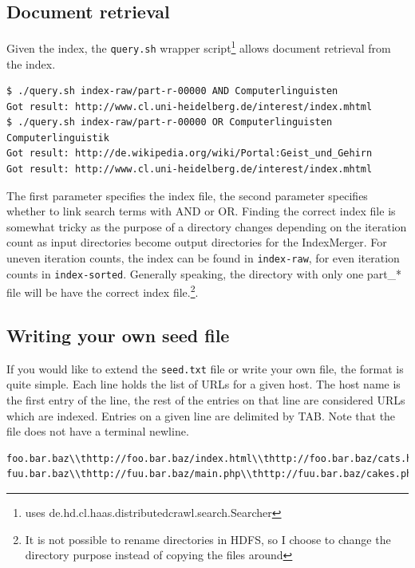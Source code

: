 \documentclass[10pt,a4paper]{report}
\begin{document}
\subsection*{Document retrieval}
Given the index, the \texttt{query.sh} wrapper script\footnote{uses de.hd.cl.haas.distributedcrawl.search.Searcher} allows document retrieval from the index.
\begin{verbatim}
$ ./query.sh index-raw/part-r-00000 AND Computerlinguisten
Got result: http://www.cl.uni-heidelberg.de/interest/index.mhtml
$ ./query.sh index-raw/part-r-00000 OR Computerlinguisten Computerlinguistik
Got result: http://de.wikipedia.org/wiki/Portal:Geist_und_Gehirn
Got result: http://www.cl.uni-heidelberg.de/interest/index.mhtml
\end{verbatim}
The first parameter specifies the index file, the second parameter specifies whether to link search terms with AND or OR. Finding the correct index file is somewhat tricky as
the purpose of a directory changes depending on the iteration count as input directories become output directories for the IndexMerger. For uneven iteration counts, the index can be found in \texttt{index-raw}, for even iteration counts in \texttt{index-sorted}. Generally speaking, the directory with only one part\_* file will be have the correct index file.\footnote{It is not possible to rename directories in HDFS, so I choose to change the directory purpose instead of copying the files around}.
\subsection*{Writing your own seed file}
If you would like to extend the \texttt{seed.txt} file or write your own file, the format is quite simple.
Each line holds the list of URLs for a given host. The host name is the first entry of the line, the rest of the entries
on that line are considered URLs which are indexed. Entries on a given line are delimited by TAB. Note that the file does not have a terminal newline.
\begin{verbatim}
foo.bar.baz\\thttp://foo.bar.baz/index.html\\thttp://foo.bar.baz/cats.html\n
fuu.bar.baz\\thttp://fuu.bar.baz/main.php\\thttp://fuu.bar.baz/cakes.php
\end{verbatim}
\end{document}
